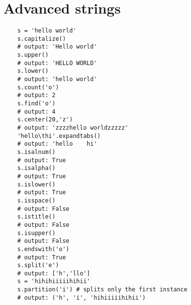 \section{Advanced strings}
\begin{verbatim}
    s = 'hello world'
    s.capitalize()
    # output: 'Hello world'
    s.upper()
    # output: 'HELLO WORLD'
    s.lower()
    # output: 'hello world'
    s.count('o')
    # output: 2
    s.find('o')
    # output: 4
    s.center(20,'z')
    # output: 'zzzzhello worldzzzzz'
    'hello\thi'.expandtabs()
    # output: 'hello    hi'
    s.isalnum()
    # output: True
    s.isalpha() 
    # output: True 
    s.islower()
    # output: True
    s.isspace()
    # output: False 
    s.istitle()
    # output: False 
    s.isupper()
    # output: False
    s.endswith('o')
    # output: True
    s.split('e')
    # output: ['h','llo']
    s = 'hihihiiiiihihii'
    s.partition('i') # splits only the first instance
    # output: ('h', 'i', 'hihiiiiihihii')
\end{verbatim}


